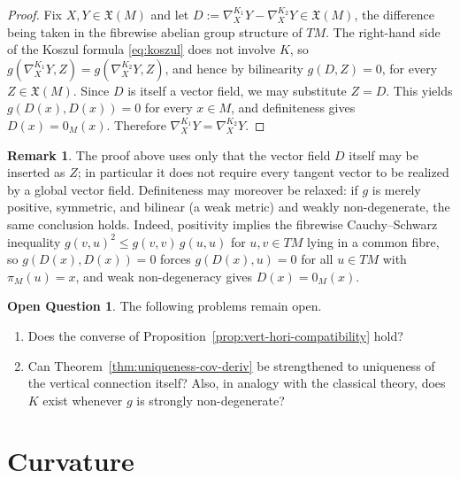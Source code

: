 \documentclass{amsart}
\theoremstyle{definition}
\newtheorem{rem}[thm]{Remark}
\newtheorem{prob}[thm]{Open Question}
\begin{document}
\begin{proof}
  Fix $X, Y \in \mathfrak{X}(M)$ and let
  $D := \nabla^{K_1}_X Y - \nabla^{K_2}_X Y \in \mathfrak{X}(M)$,
  the difference being taken in the fibrewise abelian group structure of
  $TM$. The right-hand side of the Koszul formula \eqref{eq:koszul} does
  not involve $K$, so
  $g(\nabla^{K_1}_X Y, Z) = g(\nabla^{K_2}_X Y, Z)$, and hence by
  bilinearity $g(D, Z) = 0$, for every $Z \in \mathfrak{X}(M)$.
  Since $D$ is itself a vector field, we may substitute $Z = D$.
  This yields $g(D(x), D(x)) = 0$ for every $x \in M$, and
  definiteness gives $D(x) = 0_M(x)$. Therefore
  $\nabla^{K_1}_X Y = \nabla^{K_2}_X Y$.
\end{proof}

\begin{rem}\label{rem:uniqueness-weak-metric}
  The proof above uses only that the vector field $D$ itself may be
  inserted as $Z$; in particular it does not require every tangent vector
  to be realized by a global vector field. Definiteness may moreover be
  relaxed: if $g$ is merely positive, symmetric, and bilinear (a weak
  metric) and weakly non-degenerate, the same conclusion holds. Indeed,
  positivity implies the fibrewise Cauchy--Schwarz inequality
  $g(v, u)^2 \leq g(v, v)\, g(u, u)$ for $u, v \in TM$ lying in a common
  fibre, so $g(D(x), D(x)) = 0$ forces $g(D(x), u) = 0$ for all
  $u \in TM$ with $\pi_M(u) = x$, and weak non-degeneracy gives
  $D(x) = 0_M(x)$.
\end{rem}

\begin{prob}\label{prob:open-questions}
  The following problems remain open.
  \begin{enumerate}
    \item Does the converse of Proposition~\ref{prop:vert-hori-compatibility} hold?
    \item Can Theorem~\ref{thm:uniqueness-cov-deriv} be strengthened to
      uniqueness of the vertical connection itself?
      Also, in analogy with the classical theory, does $K$ exist whenever
      $g$ is strongly non-degenerate?
  \end{enumerate}
\end{prob}

\section{Curvature}\label{sec:curvature}
\end{document}
